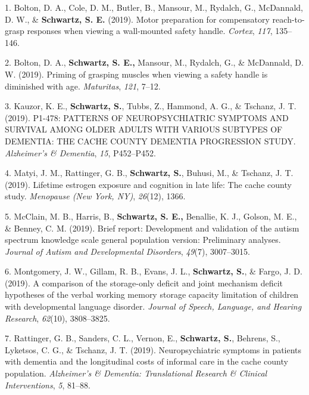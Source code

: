 \documentclass[11pt,a4paper,]{moderncv}
\newlength{\cslhangindent}
\newenvironment{CSLReferences}[2] %
 {\begin{list}{}{%
  \setlength{\itemindent}{0pt}
  \setlength{\leftmargin}{0pt}
  \setlength{\parsep}{0pt}
  \ifodd #1
   \setlength{\leftmargin}{\cslhangindent}
   \setlength{\itemindent}{-1\cslhangindent}
  \fi
  \setlength{\itemsep}{#2\baselineskip}}}
 {\end{list}}
\begin{document}
\label{refs-f21370c8901f220ba9f1c38726cf908b}
\begin{CSLReferences}{1}{0}
1. Bolton, D. A., Cole, D. M., Butler, B., Mansour, M., Rydalch, G.,
McDannald, D. W., \& \textbf{Schwartz, S. E.} (2019). Motor preparation
for compensatory reach-to-grasp responses when viewing a wall-mounted
safety handle. \emph{Cortex}, \emph{117}, 135--146.

2. Bolton, D. A., \textbf{Schwartz, S. E.,} Mansour, M., Rydalch, G., \&
McDannald, D. W. (2019). Priming of grasping muscles when viewing a
safety handle is diminished with age. \emph{Maturitas}, \emph{121},
7--12.

3. Kauzor, K. E., \textbf{Schwartz, S.}, Tubbs, Z., Hammond, A. G., \&
Tschanz, J. T. (2019). P1-478: PATTERNS OF NEUROPSYCHIATRIC SYMPTOMS AND
SURVIVAL AMONG OLDER ADULTS WITH VARIOUS SUBTYPES OF DEMENTIA: THE CACHE
COUNTY DEMENTIA PROGRESSION STUDY. \emph{Alzheimer's \& Dementia},
\emph{15}, P452--P452.

4. Matyi, J. M., Rattinger, G. B., \textbf{Schwartz, S.}, Buhusi, M., \&
Tschanz, J. T. (2019). Lifetime estrogen exposure and cognition in late
life: The cache county study. \emph{Menopause (New York, NY)},
\emph{26}(12), 1366.

5. McClain, M. B., Harris, B., \textbf{Schwartz, S. E.,} Benallie, K.
J., Golson, M. E., \& Benney, C. M. (2019). Brief report: Development
and validation of the autism spectrum knowledge scale general population
version: Preliminary analyses. \emph{Journal of Autism and Developmental
Disorders}, \emph{49}(7), 3007--3015.

6. Montgomery, J. W., Gillam, R. B., Evans, J. L.,
\textbf{Schwartz, S.}, \& Fargo, J. D. (2019). A comparison of the
storage-only deficit and joint mechanism deficit hypotheses of the
verbal working memory storage capacity limitation of children with
developmental language disorder. \emph{Journal of Speech, Language, and
Hearing Research}, \emph{62}(10), 3808--3825.

7. Rattinger, G. B., Sanders, C. L., Vernon, E., \textbf{Schwartz, S.},
Behrens, S., Lyketsos, C. G., \& Tschanz, J. T. (2019). Neuropsychiatric
symptoms in patients with dementia and the longitudinal costs of
informal care in the cache county population. \emph{Alzheimer's \&
Dementia: Translational Research \& Clinical Interventions}, \emph{5},
81--88.


\end{CSLReferences}
\end{document}
